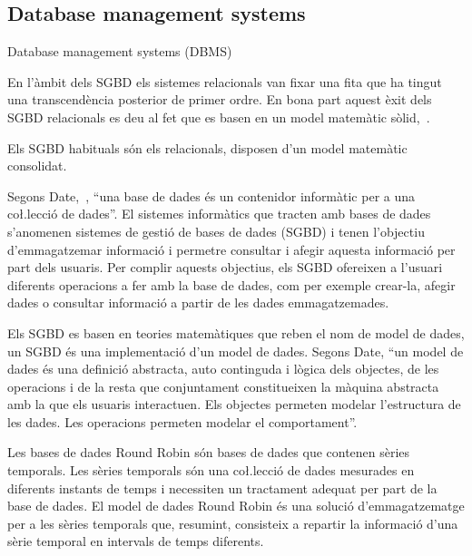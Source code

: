 \subsection{Database management systems}

Database management systems (DBMS)

En l'àmbit dels SGBD els sistemes relacionals van fixar una fita que ha tingut una transcendència posterior de  primer ordre. En bona part aquest èxit dels SGBD relacionals es deu al fet que es basen en un model matemàtic sòlid,~\cite{date}.

Els SGBD habituals són els relacionals,  disposen d'un model matemàtic consolidat.


Segons Date,~\cite{date}, ``una base de dades és un contenidor informàtic per a una co\l.lecció de dades''. El sistemes informàtics que tracten amb bases de dades s'anomenen sistemes de gestió de bases de dades (SGBD) i tenen l'objectiu d'emmagatzemar informació i permetre consultar i afegir aquesta informació  per part dels usuaris.
Per complir aquests objectius, els SGBD ofereixen a l'usuari diferents operacions a fer amb la base de dades, com per exemple crear-la, afegir dades o consultar informació a partir de les dades emmagatzemades.

Els SGBD es basen en teories matemàtiques que reben el nom de model de dades, un SGBD és una implementació d'un model de dades.
Segons Date, ``un model de dades és una definició abstracta, auto continguda i lògica dels objectes, de les operacions i  de la resta que conjuntament constitueixen la màquina abstracta amb la que els usuaris interactuen. Els objectes permeten modelar l'estructura de les dades. Les operacions permeten modelar el comportament''.

Les bases de dades Round Robin són bases de dades que contenen sèries temporals. Les sèries temporals són una co\l.lecció de dades mesurades en diferents instants de temps i necessiten un tractament adequat per part de la base de dades. 
El model de dades Round Robin és una solució d'emmagatzematge per a les sèries temporals que, resumint, consisteix a repartir la informació d'una sèrie temporal en intervals de temps diferents.

